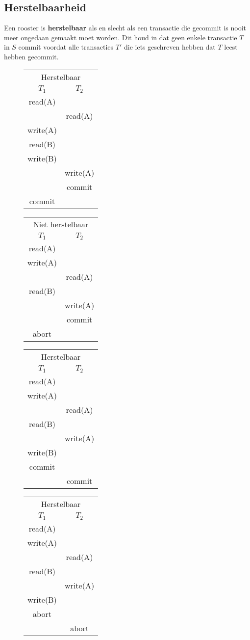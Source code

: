 \documentclass[transacties.tex]{subfiles}
\begin{document}
\subsection{Herstelbaarheid}
\begin{de}
Een rooster is \textbf{herstelbaar} als en slecht als een transactie die gecommit is nooit meer ongedaan gemaakt moet worden.
Dit houd in dat geen enkele transactie $T$ in $S$ commit voordat alle transacties $T'$ die iets geschreven hebben dat $T$ leest hebben gecommit. 
\end{de}
\begin{figure}[H]
\centering
\begin{tabular}{c|c}
\multicolumn{2}{c}{Herstelbaar}\\
$T_1$&$T_2$\\
\hline
read(A) &\\
& read(A)\\
write(A)&\\
read(B)&\\
write(B)&\\
&write(A)\\
&commit\\
commit&
\end{tabular}
\begin{tabular}{c|c}
\multicolumn{2}{c}{Niet herstelbaar}\\
$T_1$&$T_2$\\
\hline
read(A) &\\
write(A)&\\
& read(A)\\
read(B)&\\
&write(A)\\
&commit\\
abort&
\end{tabular}
\begin{tabular}{c|c}
\multicolumn{2}{c}{Herstelbaar}\\
$T_1$&$T_2$\\
\hline
read(A) &\\
write(A)&\\
& read(A)\\
read(B)&\\
&write(A)\\
write(B)&\\
commit&\\
&commit\\
\end{tabular}
\begin{tabular}{c|c}
\multicolumn{2}{c}{Herstelbaar}\\
$T_1$&$T_2$\\
\hline
read(A) &\\
write(A)&\\
& read(A)\\
read(B)&\\
&write(A)\\
write(B)&\\
abort&\\
&abort\\
\end{tabular}
\end{figure}
\end{document}

